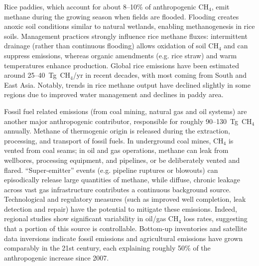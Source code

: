 Rice paddies, which account for about 8--10\% of anthropogenic CH$_4$, emit methane during the growing season when fields are flooded. Flooding creates anoxic soil conditions similar to natural wetlands, enabling methanogenesis in rice soils. Management practices strongly influence rice methane fluxes: intermittent drainage (rather than continuous flooding) allows oxidation of soil CH$_4$ and can suppress emissions, whereas organic amendments (e.g. rice straw) and warm temperatures enhance production. Global rice emissions have been estimated around 25--40~Tg~CH$_4$/yr in recent decades, with most coming from South and East Asia. Notably, trends in rice methane output have declined slightly in some regions due to improved water management and declines in paddy area.

Fossil fuel related emissions (from coal mining, natural gas and oil systems) are another major anthropogenic contributor, responsible for roughly 90--130~Tg~CH$_4$ annually. Methane of thermogenic origin is released during the extraction, processing, and transport of fossil fuels. In underground coal mines, CH$_4$ is vented from coal seams; in oil and gas operations, methane can leak from wellbores, processing equipment, and pipelines, or be deliberately vented and flared. ``Super-emitter'' events (e.g. pipeline ruptures or blowouts) can episodically release large quantities of methane, while diffuse, chronic leakage across vast gas infrastructure contributes a continuous background source. Technological and regulatory measures (such as improved well completion, leak detection and repair) have the potential to mitigate these emissions. Indeed, regional studies show significant variability in oil/gas CH$_4$ loss rates, suggesting that a portion of this source is controllable. Bottom-up inventories and satellite data inversions indicate fossil emissions and agricultural emissions have grown comparably in the 21st century, each explaining roughly 50\% of the anthropogenic increase since 2007.

